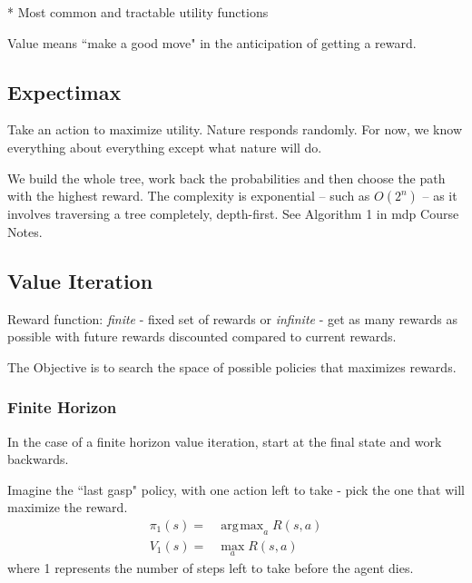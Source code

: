 \documentclass[11pt, oneside]{article}   	%
\DeclareMathOperator*{\argmax}{\arg\!\max}
\begin{document}
* Most common and tractable utility functions

Value means ``make a good move" in the anticipation of getting a reward.

\subsection{Expectimax}

Take an action to maximize utility. Nature responds randomly. For now, we know everything about everything except what nature will do.

We build the whole tree, work back the probabilities and then choose the path with the highest reward. The complexity is exponential -- such as $O(2^n)$ -- as it involves traversing a tree completely, depth-first. See Algorithm 1 in mdp Course Notes.

\subsection{Value Iteration}
Reward function: \emph{finite} - fixed set of rewards or \emph{infinite} - get as many rewards as possible with future rewards discounted compared to current rewards.

The Objective is to search the space of possible policies that maximizes rewards.

\subsubsection{Finite Horizon}

In the case of a finite horizon value iteration, start at the final state and work backwards.

Imagine the ``last gasp" policy, with one action left to take - pick the one that will maximize the reward.
\begin{align}
\pi_1(s) = &\argmax_a R(s,a)\\
V_1(s) = & \max_a R(s,a)
\end{align}
where 1 represents the number of steps left to take before the agent dies.
\end{document}
